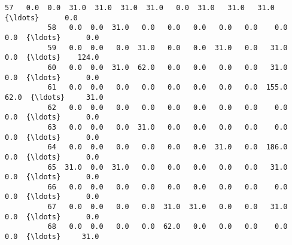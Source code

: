 \documentclass[11pt]{article}
\begin{document}
\begin{Verbatim}[commandchars=\\\{\}]
          57   0.0  0.0  31.0  31.0  31.0  31.0   0.0  31.0   31.0   31.0  {\ldots}      0.0   
          58   0.0  0.0  31.0   0.0   0.0   0.0   0.0   0.0    0.0    0.0  {\ldots}      0.0   
          59   0.0  0.0   0.0  31.0   0.0   0.0  31.0   0.0   31.0    0.0  {\ldots}    124.0   
          60   0.0  0.0  31.0  62.0   0.0   0.0   0.0   0.0   31.0    0.0  {\ldots}      0.0   
          61   0.0  0.0   0.0   0.0   0.0   0.0   0.0   0.0  155.0   62.0  {\ldots}     31.0   
          62   0.0  0.0   0.0   0.0   0.0   0.0   0.0   0.0    0.0    0.0  {\ldots}      0.0   
          63   0.0  0.0   0.0  31.0   0.0   0.0   0.0   0.0    0.0    0.0  {\ldots}      0.0   
          64   0.0  0.0   0.0   0.0   0.0   0.0  31.0   0.0  186.0    0.0  {\ldots}      0.0   
          65  31.0  0.0  31.0   0.0   0.0   0.0   0.0   0.0   31.0    0.0  {\ldots}      0.0   
          66   0.0  0.0   0.0   0.0   0.0   0.0   0.0   0.0    0.0    0.0  {\ldots}      0.0   
          67   0.0  0.0   0.0   0.0  31.0  31.0   0.0   0.0   31.0    0.0  {\ldots}      0.0   
          68   0.0  0.0   0.0   0.0  62.0   0.0   0.0   0.0    0.0    0.0  {\ldots}     31.0   
          

\end{Verbatim}
\end{document}
